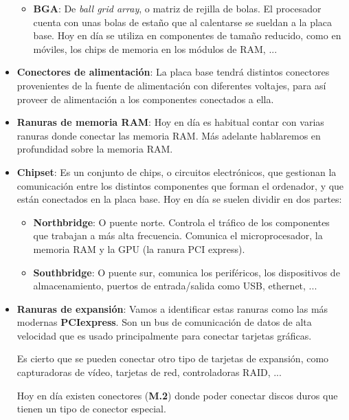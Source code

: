 \begin{itemize}
\begin{itemize}
        \item \textbf{BGA}: De \textit{ball grid array}, o matriz de rejilla de bolas. El procesador cuenta con unas bolas de estaño que al calentarse se sueldan a la placa base. Hoy en día se utiliza en componentes de tamaño reducido, como en móviles, los chips de memoria en los módulos de RAM, ...
    \end{itemize}

    \item \textbf{Conectores de alimentación}: La placa base tendrá distintos conectores provenientes de la fuente de alimentación con diferentes voltajes, para así proveer de alimentación a los componentes conectados a ella.

    \item \textbf{Ranuras de memoria RAM}: Hoy en día es habitual contar con varias ranuras donde conectar las memoria RAM. Más adelante hablaremos en profundidad sobre la memoria RAM.

    \item \textbf{Chipset}: Es un conjunto de chips, o circuitos electrónicos, que gestionan la comunicación entre los distintos componentes que forman el ordenador, y que están conectados en la placa base. Hoy en día se suelen dividir en dos partes:
    \begin{itemize}
        \item \textbf{Northbridge}: O puente norte. Controla el tráfico de los componentes que trabajan a más alta frecuencia. Comunica el microprocesador, la memoria RAM y la GPU (la ranura PCI express).
        \item \textbf{Southbridge}: O puente sur, comunica los periféricos, los dispositivos de almacenamiento, puertos de entrada/salida como USB, ethernet, ...
    \end{itemize}


    \item \textbf{Ranuras de expansión}: Vamos a identificar estas ranuras como las más modernas  \textbf{PCIexpress}. Son un bus de comunicación de datos de alta velocidad que es usado principalmente para conectar tarjetas gráficas.

    Es cierto que se pueden conectar otro tipo de tarjetas de expansión, como capturadoras de vídeo, tarjetas de red, controladoras RAID, ...

    Hoy en día existen conectores (\textbf{M.2}) donde poder conectar discos duros que tienen un tipo de conector especial.


\end{itemize}
